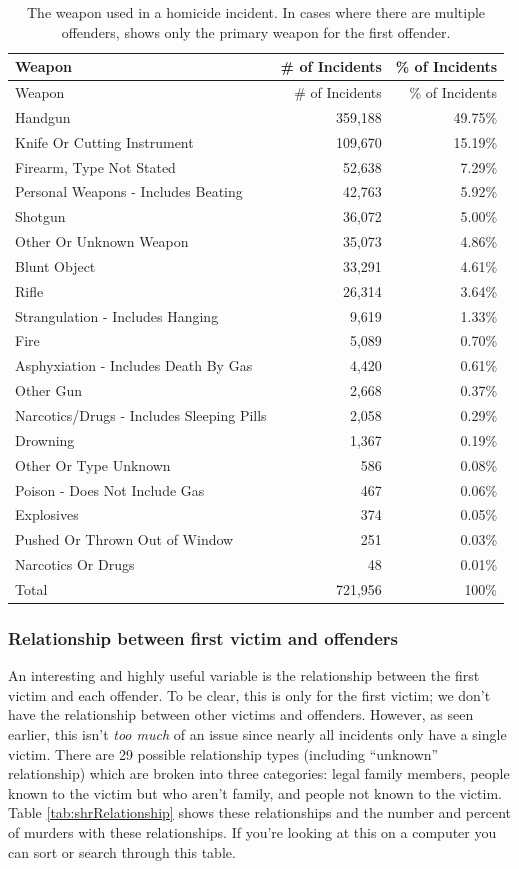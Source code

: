 \documentclass[
  12pt,
  openany]{book}
\begin{document}
\begin{longtable}[]{@{}lrr@{}}
\caption{\label{tab:shrWeapon}The weapon used in a homicide incident. In cases where there are multiple offenders, shows only the primary weapon for the first offender.}\tabularnewline
\toprule
Weapon & \# of Incidents & \% of Incidents\tabularnewline
\midrule
\endfirsthead
\toprule
Weapon & \# of Incidents & \% of Incidents\tabularnewline
\midrule
\endhead
Handgun & 359,188 & 49.75\%\tabularnewline
Knife Or Cutting Instrument & 109,670 & 15.19\%\tabularnewline
Firearm, Type Not Stated & 52,638 & 7.29\%\tabularnewline
Personal Weapons - Includes Beating & 42,763 & 5.92\%\tabularnewline
Shotgun & 36,072 & 5.00\%\tabularnewline
Other Or Unknown Weapon & 35,073 & 4.86\%\tabularnewline
Blunt Object & 33,291 & 4.61\%\tabularnewline
Rifle & 26,314 & 3.64\%\tabularnewline
Strangulation - Includes Hanging & 9,619 & 1.33\%\tabularnewline
Fire & 5,089 & 0.70\%\tabularnewline
Asphyxiation - Includes Death By Gas & 4,420 & 0.61\%\tabularnewline
Other Gun & 2,668 & 0.37\%\tabularnewline
Narcotics/Drugs - Includes Sleeping Pills & 2,058 & 0.29\%\tabularnewline
Drowning & 1,367 & 0.19\%\tabularnewline
Other Or Type Unknown & 586 & 0.08\%\tabularnewline
Poison - Does Not Include Gas & 467 & 0.06\%\tabularnewline
Explosives & 374 & 0.05\%\tabularnewline
Pushed Or Thrown Out of Window & 251 & 0.03\%\tabularnewline
Narcotics Or Drugs & 48 & 0.01\%\tabularnewline
Total & 721,956 & 100\%\tabularnewline
\bottomrule
\end{longtable}

\hypertarget{relationship-between-first-victim-and-offenders}{%
\subsubsection{Relationship between first victim and offenders}\label{relationship-between-first-victim-and-offenders}}

An interesting and highly useful variable is the relationship between the first victim and each offender. To be clear, this is only for the first victim; we don't have the relationship between other victims and offenders. However, as seen earlier, this isn't \emph{too much} of an issue since nearly all incidents only have a single victim. There are 29 possible relationship types (including ``unknown'' relationship) which are broken into three categories: legal family members, people known to the victim but who aren't family, and people not known to the victim. Table \ref{tab:shrRelationship} shows these relationships and the number and percent of murders with these relationships. If you're looking at this on a computer you can sort or search through this table.
\end{document}
